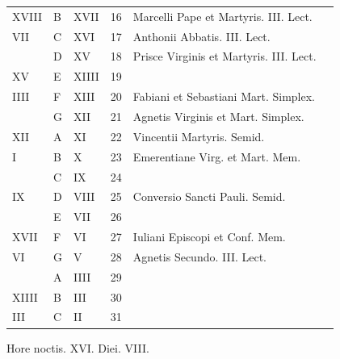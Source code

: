 \begin{center}
\begin{tabular}{l | l | l | r | l l}
\color{Red} XVIII & B & \color{Red} XVII & 16 & Marcelli Pape et Martyris. III. Lect. \\
\color{Red} VII & C & \color{Red} XVI & 17 & \color{Red} Anthonii Abbatis. III. Lect. \\
 & D & \color{Red} XV & 18 & Prisce Virginis et Martyris. III. Lect. \\
\color{Red} XV & E & \color{Red} XIIII & 19 & \color{Red} \\
\color{Red} IIII & F & \color{Red} XIII & 20 & \multicolumn{2}{l}{Fabiani et Sebastiani Mart. Simplex.} \\
 & G & \color{Red} XII & 21 & Agnetis Virginis et Mart. Simplex. \\
\color{Red} XII & \color{Red} A & \color{Red} XI & 22 & Vincentii Martyris. Semid. \\
\color{Red} I & B & \color{Red} X & 23 & \color{Red} Emerentiane Virg. et Mart. Mem. \\
 & C & \color{Red} IX & 24 & & \color{Red} \\
\color{Red} IX & D & \color{Red} VIII & 25 & Conversio Sancti Pauli. Semid. \\
& E & \color{Red} VII & 26 & & \color{Red} \\
\color{Red} XVII & F & \color{Red} VI & 27 & \color{Red} Iuliani Episcopi et Conf. Mem. \\
\color{Red} VI & G & \color{Red} V & 28 & \color{Red} Agnetis Secundo. III. Lect. \\
 & \color{Red} A & \color{Red} IIII & 29 & & \color{Red} \\
\color{Red} XIIII & B & \color{Red} III & 30 & & \color{Red} \\
\color{Red} III & C & \color{Red} II & 31 & & \color{Red} \\
\end{tabular}
\color{Red} Hore noctis. XVI. Diei. VIII.
\end{center}



\newpage
\color{Red}\color{black}

